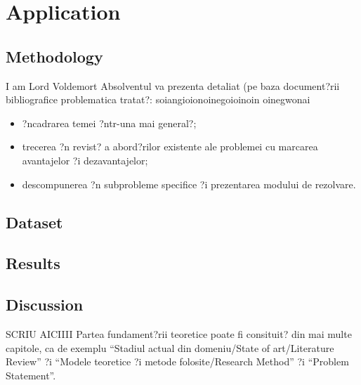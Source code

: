 \chapter{Application}
\label{CapFT}

\section{Methodology}
I am Lord Voldemort
Absolventul va prezenta detaliat (pe baza document?rii bibliografice problematica tratat?:
soiangioionoinegoioinoin oinegwonai
\begin{itemize}
	\item ?ncadrarea temei ?ntr-una mai general?;
	\item trecerea ?n revist? a abord?rilor existente ale problemei cu marcarea avantajelor ?i dezavantajelor;
	\item descompunerea ?n subprobleme specifice ?i prezentarea modului de rezolvare.
\end{itemize}

\section{Dataset}

\section{Results}

\section{Discussion}

SCRIU AICIIII
	Partea fundament?rii teoretice poate fi consituit? din mai multe capitole, ca de exemplu ``Stadiul actual din domeniu/State of art/Literature Review'' ?i ``Modele teoretice ?i metode folosite/Research Method'' ?i ``Problem Statement''.

